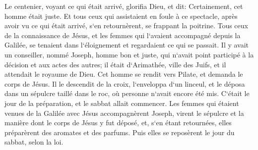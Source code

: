 \verse Le centenier, voyant ce qui était arrivé, glorifia Dieu, et dit: Certainement, cet homme était juste. 
\verse Et tous ceux qui assistaient en foule à ce spectacle, après avoir vu ce qui était arrivé, s`en retournèrent, se frappant la poitrine. 
\verse Tous ceux de la connaissance de Jésus, et les femmes qui l`avaient accompagné depuis la Galilée, se tenaient dans l`éloignement et regardaient ce qui se passait. 
\verse Il y avait un conseiller, nommé Joseph, homme bon et juste, 
\verse qui n`avait point participé à la décision et aux actes des autres; il était d`Arimathée, ville des Juifs, et il attendait le royaume de Dieu. 
\verse Cet homme se rendit vers Pilate, et demanda le corps de Jésus. 
\verse Il le descendit de la croix, l`enveloppa d`un linceul, et le déposa dans un sépulcre taillé dans le roc, où personne n`avait encore été mis. 
\verse C`était le jour de la préparation, et le sabbat allait commencer. 
\verse Les femmes qui étaient venues de la Galilée avec Jésus accompagnèrent Joseph, virent le sépulcre et la manière dont le corps de Jésus y fut déposé, 
\verse et, s`en étant retournées, elles préparèrent des aromates et des parfums. Puis elles se reposèrent le jour du sabbat, selon la loi. 

\chapter{}

